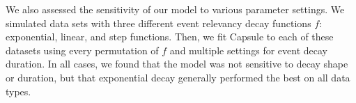 We also assessed the sensitivity of our model to various parameter settings.  We simulated data sets with three different event relevancy decay functions $f$: exponential, linear, and step functions.  Then, we fit Capsule to each of these datasets using every permutation of $f$ and multiple settings for event decay duration.  In all cases, we found that the model was not sensitive to decay shape or duration, but that exponential decay generally performed the best on all data types.












